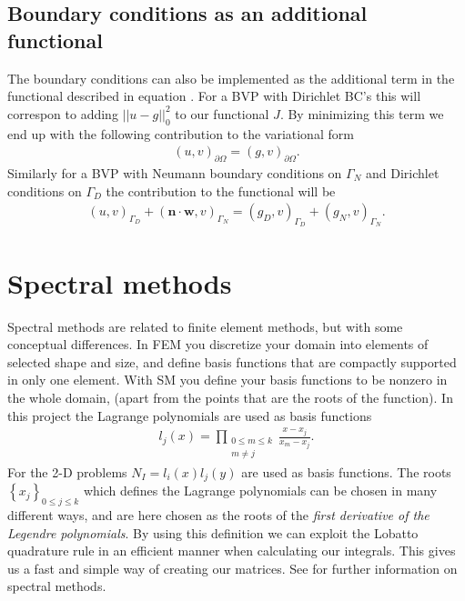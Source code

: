 \subsection{Boundary conditions as an additional functional}
The boundary conditions can also be implemented as the additional term in the functional described in equation . For a BVP with Dirichlet BC's this will correspon to adding $||u-g||^2_0$ to our functional $J$. By minimizing this term we end up with the following contribution to the variational form
\begin{align}
	(u,v)_{\partial \Omega}=(g,v)_{\partial \Omega}.
	\label{eq:BCFunctionalImplementationContribution}
\end{align}
Similarly for a BVP with Neumann boundary conditions on $\Gamma_N$ and Dirichlet conditions on $\Gamma_D$ the contribution to the functional will be
\begin{align}
	(u,v)_{\Gamma_D} + (\mathbf{n}\cdot \mathbf{w},v)_{\Gamma_N}=
	(g_D,v)_{\Gamma_D} + (g_N,v)_{\Gamma_N}.
	\label{eq:NeuDirFunctional}
\end{align}
\section{Spectral methods}
Spectral methods are related to finite element methods, but with some conceptual differences. In FEM you discretize your domain into elements of selected shape and size, and define basis functions that are compactly supported in only one element. With SM you define your basis functions to be nonzero in the whole domain, (apart from the points that are the roots of the function). In this project the Lagrange polynomials are used as basis functions
%
\begin{align}
	l_j(x) = \prod_{\substack{0\leq m \leq k \\  m \neq j}} \frac{x-x_j}{x_m-x_j}.
	\label{eq:lagpolynomials}
\end{align}
For the 2-D problems $N_I = l_i(x)l_j(y)$ are used as basis functions.
The roots $\left\{ x_j \right\}_{0\leq j \leq k}$ which defines the Lagrange polynomials can be chosen in many different ways, and are here chosen as the roots of the \textit{first derivative of the Legendre polynomials}. By using this definition we can exploit the Lobatto quadrature rule in an efficient manner when calculating our integrals. This gives us a fast and simple way of creating our matrices. See \cite{Canuto} for further information on spectral methods.
